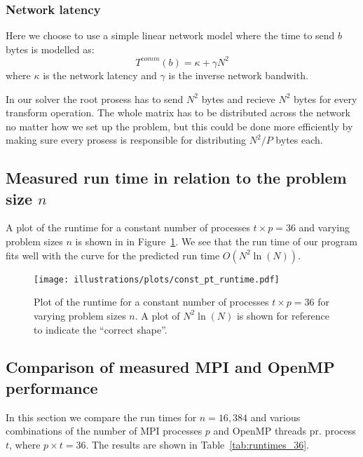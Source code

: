 \subsubsection{Network latency} %
\label{ssub:network_latency}

Here we choose to use a simple linear network model where the time to send $b$ bytes is modelled as:
\begin{equation}
  T^{comm}(b) = \kappa + \gamma N^2
\end{equation}
where $\kappa$ is the network latency and $\gamma$ is the inverse network bandwith.

In our solver the root prosess has to send $N^2$ bytes and recieve $N^2$ bytes for every transform operation. The whole matrix has to be distributed across the network no matter how we set up the problem, but this could be done more efficiently by making sure every prosess is responsible for distributing $N^2/P$ bytes each.





\subsection{Measured run time in relation to the problem size $n$} %
\label{sub:run_time_in_relation_to_the_problem_size_n_}

A plot of the runtime for a constant number of processes $t\times p = 36$ and varying problem sizes $n$ is shown in in Figure~\ref{fig:runtime_const_pt}. We see that the run time of our program fits well with the curve for the predicted run time $O(N^2 \ln(N))$.

\begin{figure}[H]
  \centering
  \texttt{[image: illustrations/plots/const\_pt\_runtime.pdf]}
  \caption{Plot of the runtime for a constant number of processes $t\times p = 36$ for varying problem sizes $n$. A plot of $N^2 \ln(N)$ is shown for reference to indicate the ``correct shape''.}
  \label{fig:runtime_const_pt}
\end{figure}



\subsection{Comparison of measured MPI and OpenMP performance} %
\label{sub:comparison_of_mpi_and_openmp_performance}
In this section we compare the run times for $n=16,384$ and various combinations of the number of MPI processes $p$ and OpenMP threads pr. process $t$, where $p\times t = 36$. The results are shown in Table~\ref{tab:runtimes_36}.

